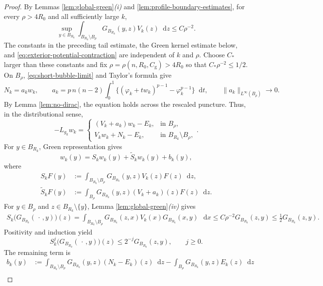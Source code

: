 \documentclass[10pt,a4paper]{amsart}
\newcommand{\dd}{\mathop{}\!\mathrm{d}}
\theoremstyle{plain}
\theoremstyle{remark}
\begin{document}
\begin{proof}
By  Lemmas  \ref{lem:global-green}\emph{(i)} and
\ref{lem:profile-boundary-estimates}, for every $\rho>4R_0$ and all
sufficiently large $k$,
{
\[
 \sup_{y\in B_{R_k}}
 \int_{B_{R_k}\setminus B_\rho}
 G_{B_{R_k}}(y,z)V_k(z)\dd z
 \le C\rho^{-2}.
\]
}
The constants in the preceding tail estimate, the Green kernel estimate
below, and \eqref{eq:exterior-potential-contraction} are independent of
\(k\) and \(\rho\). Choose \(C_*\) larger than these constants and fix
$\rho=\rho(n,R_0,C_{\mathrm g})>4R_0$ so that
$C_*\rho^{-2}\le1/2$.
 On $B_\rho$, \eqref{eq:short-bubble-limit} and Taylor's formula give
{
\[
 N_k=a_kw_k,\qquad
 a_k=p\,n(n-2)\int_0^1
 \big\{(\varphi_k+tw_k)^{p-1}-\varphi_k^{p-1}\big\}\dd t,
 \qquad \|a_k\|_{L^\infty(B_\rho)}\to0.
\]
}
 By Lemma  \ref{lem:no-dirac}, the equation holds across the
rescaled puncture. Thus, in the distributional sense,
{
\[
 -L_{g_k}w_k=
 \begin{cases}
  (V_k+a_k)w_k-E_k,&\text{in }B_\rho,\\
  V_kw_k+N_k-E_k,&\text{in }B_{R_k}\setminus B_\rho,
 \end{cases}.
\]
}
For $y\in B_{R_k}$, Green representation gives
{
\begin{equation}\label{eq:basic-green-decomposition}
 w_k(y)=S_kw_k(y)+\widetilde S_kw_k(y)+b_k(y),
\end{equation}
}
where
{
\[
 \begin{aligned}
 S_kF(y)&:=\int_{B_{R_k}\setminus B_\rho}
 G_{B_{R_k}}(y,z)V_k(z)F(z)\dd z,\\
 \widetilde S_kF(y)&:=\int_{B_\rho}
 G_{B_{R_k}}(y,z)(V_k+a_k)(z)F(z)\dd z.
 \end{aligned}
\]
}
For \(y\in B_\rho\) and \(z\in B_{R_k}\setminus\{y\}\),
Lemma  \ref{lem:global-green}\emph{(iv)} gives
\[
\begin{aligned}
 S_k\bigl(G_{B_{R_k}}(\,\cdot\,,y)\bigr)(z)
 =\int_{B_{R_k}\setminus B_\rho}
 G_{B_{R_k}}(z,x)V_k(x)G_{B_{R_k}}(x,y)\,\dd x
 \le C\rho^{-2}G_{B_{R_k}}(z,y)
 \le\frac12G_{B_{R_k}}(z,y).
\end{aligned}
\]
Positivity and induction yield
\[
 S_k^j\bigl(G_{B_{R_k}}(\,\cdot\,,y)\bigr)(z)
 \le2^{-j}G_{B_{R_k}}(z,y),\qquad j\ge0.
\]
The remaining term is
{
\begin{equation}\label{eq:bk-green-forcing}
 \begin{aligned}
 b_k(y)&:=\int_{B_{R_k}\setminus B_\rho}
 G_{B_{R_k}}(y,z)(N_k-E_k)(z)\dd z
 -\int_{B_\rho}G_{B_{R_k}}(y,z)E_k(z)\dd z\\

\end{aligned}
\end{equation}}
\end{proof}
\end{document}
